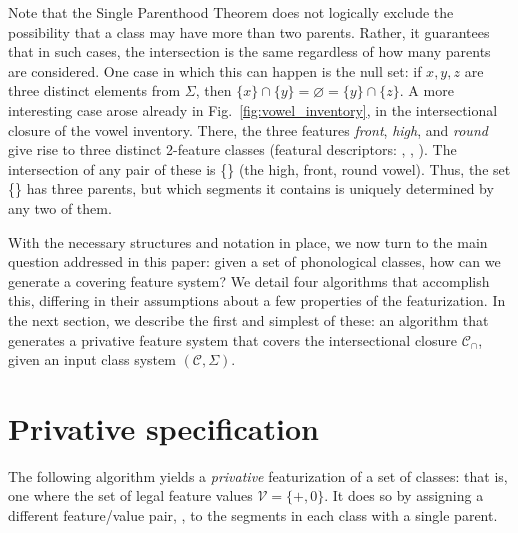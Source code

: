 \documentclass[11pt, oneside]{article}   	%
\begin{document}
\vspace{\baselineskip} Note that the Single Parenthood Theorem does not logically exclude the possibility that a class may have more than two parents. Rather, it guarantees that in such cases, the intersection is the same regardless of how many parents are considered. One case in which this can happen is the null set: if $x, y, z$ are three distinct elements from $\Sigma$, then $\{ x \} \cap \{ y \} = \varnothing = \{ y \} \cap \{ z \}$. A more interesting case arose already in Fig.~\ref{fig:vowel_inventory}, in the intersectional closure of the vowel inventory. There, the three features \textit{front}, \textit{high}, and \textit{round} give rise to three distinct 2-feature classes (featural descriptors: , , ). The intersection of any pair of these is \{\} (the high, front, round vowel). Thus, the set  \{\} has three parents, but which segments it contains is uniquely determined by any two of them.

With the necessary structures and notation in place, we now turn to the main question addressed in this paper: given a set of phonological classes, how can we generate a covering feature system? We detail four algorithms that accomplish this, differing in their assumptions about a few properties of the featurization. In the next section, we describe the first and simplest of these: an algorithm that generates a privative feature system that covers the intersectional closure $\mathcal C_\cap$, given an input class system $(\mathcal C, \Sigma)$.

\FloatBarrier
\section{Privative specification}
\label{sec:privative}

The following algorithm yields a \textit{privative} featurization of a set of classes: that is, one where the set of legal feature values $\mathcal V = \{+, 0\}$. It does so by assigning a different feature/value pair, , to the segments in each class with a single parent.
 
\end{document}
